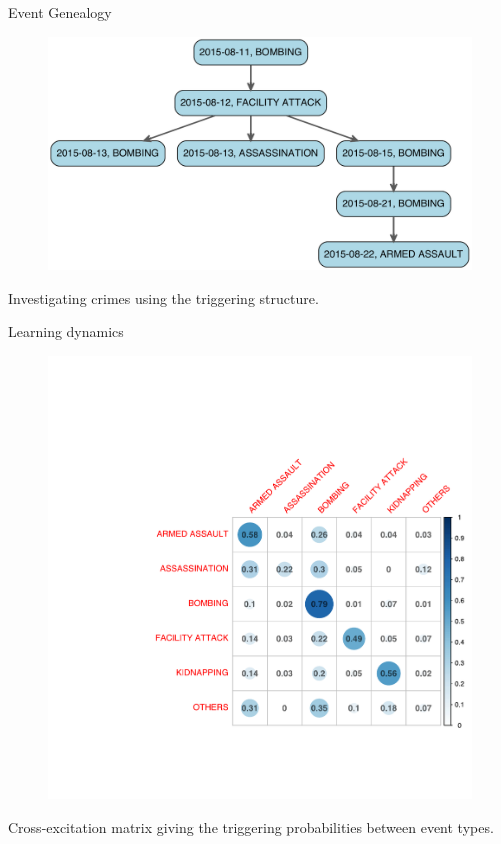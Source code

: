 \documentclass{beamer}
\begin{document}
\begin{frame}{Event Genealogy}
\begin{figure}
\centering
\includegraphics[width = 0.9\linewidth]{figures/Tree.pdf}
\end{figure}
Investigating crimes using the triggering structure.
\end{frame}

\begin{frame}{Learning dynamics}
\begin{figure}
\centering
\includegraphics[width = 0.7\linewidth]{figures/CorrPlot.pdf}
\end{figure}
Cross-excitation matrix giving the triggering probabilities between event types.
\end{frame}

{

}

{

}

{

}
\end{document}
